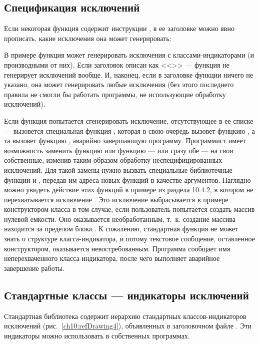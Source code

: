 \subsection[Спецификация исключений]{Спецификация исключений}
Если некоторая функция содержит инструкции , в ее заголовке можно явно прописать, какие
исключения она может генерировать:


В примере функция  может генерировать исключения с классами-индикаторами
 (и производными от них). Если заголовок описан как <<>> --- функция не генерирует исключений вообще. И, наконец, если в заголовке функции ничего не указано, она может
генерировать любые исключения (без этого последнего правила не смогли бы работать программы, не использующие обработку
исключений).

Если функция попытается сгенерировать исключение, отсутствующее в ее списке --- вызовется специальная функция
, которая в свою очередь вызовет фунцкию ,
а та вызовет функцию , аварийно завершающую программу. Программист имеет возможность
заменить функцию  или функцию  --- или сразу обе --- на
свои собственные, изменив таким образом обработку неспецифицированных исключений. Для такой замены нужно вызвать
специальные библиотечные функции  и ,
передав им адреса новых функций в качестве аргументов. Наглядно можно увидеть действие этих функций в примере из
раздела 10.4.2, в котором не перехватывается исключение . Это исключение
выбрасывается в примере конструктором класса  в том случае, если пользователь попытается
создать массив нулевой емкости. Оно оказывается необработанным, т.~к. создание массива находится за пределом блока
. К сожалению, стандартная функция не может знать о структуре класса-индикатора, и потому
текстовое сообщение, оставленное конструктором, оказывается невостребованным. Программа сообщает имя неперехваченного
класса-индикатора, после чего выполняет аварийное завершение работы.

\subsection[Стандартные классы --- индикаторы исключений]{Стандартные классы --- индикаторы исключений}
Стандартная библиотека  содержит иерархию стандартных классов-индикаторов исключений (рис.~\ref{ch10:refDrawing4}),
объявленных в заголовочном файле . Эти индикаторы можно использовать в собственных
программах.

